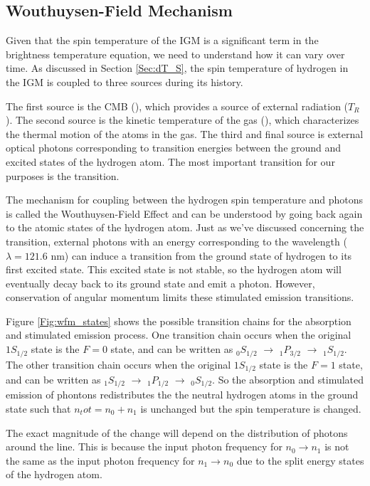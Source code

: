 \subsection{Wouthuysen-Field Mechanism}\label{Sec:WFM}

Given that the spin temperature of the IGM is a significant term in the brightness temperature equation, we need to understand how it can vary over time. As discussed in Section \ref{Sec:dT_S}, the spin temperature of hydrogen in the IGM is coupled to three sources during its history. 

The first source is the CMB (\tg), which provides a source of external radiation ($T_R$). The second source is the kinetic temperature of the gas (\tk), which characterizes the thermal motion of the atoms in the gas. The third and final source is external optical photons corresponding to transition energies between the ground and excited states of the hydrogen atom. The most important transition for our purposes is the \lya  transition. 

The mechanism for coupling between the hydrogen spin temperature and \lya  photons is called the Wouthuysen-Field Effect \cite{wouthuysen_1952}\cite{field_1958} and can be understood by going back again to the atomic states of the hydrogen atom. Just as we've discussed concerning the \cm transition, external photons with an energy corresponding to the \lya  wavelength ($\lambda = 121.6$ nm) can induce a transition from the ground state of hydrogen to its first excited state. This excited state is not stable, so the hydrogen atom will eventually decay back to its ground state and emit a photon. However, conservation of angular momentum limits these stimulated emission transitions. 

Figure \ref{Fig:wfm_states} shows the possible transition chains for the \lya absorption and stimulated emission process. One transition chain occurs when the original $1S_{1/2}$ state is the $F=0$ state, and can be written as $_0S_{1/2}$ $\rightarrow$ $_1P_{3/2}$ $\rightarrow$ $_1S_{1/2}$. The other transition chain occurs when the original $1S_{1/2}$ state is the $F=1$ state, and can be written as $_1S_{1/2}$ $\rightarrow$ $_1P_{1/2}$ $\rightarrow$ $_0S_{1/2}$. So the absorption and stimulated emission of \lya phontons redistributes the the neutral hydrogen atoms in the ground state such that $n_tot = n_0 + n_1$ is unchanged but the spin temperature is changed. 

The exact magnitude of the change will depend on the distribution of photons around the \lya  line. This is because the input photon frequency for $n_0 \rightarrow n_1$ is not the same as the input photon frequency for $n_1 \rightarrow n_0$ due to the split energy states of the hydrogen atom. 

